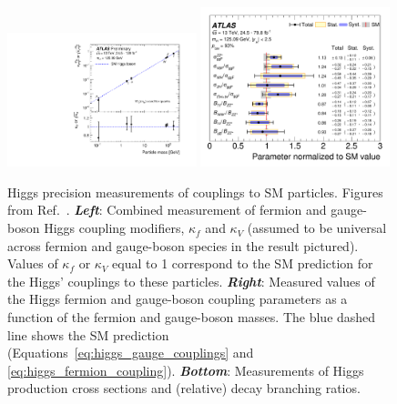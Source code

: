 \begin{figure}[!htb]
    \begin{center}
        \includegraphics[width=0.49\textwidth]{figures/chapter1/sm_final/higgs_kappa_vs_mass}
        \includegraphics[width=0.49\textwidth]{figures/chapter1/sm_final/higgs_prod_and_br}
        \caption{
            Higgs precision measurements of couplings to SM particles.
            Figures from Ref.~\cite{HiggsProps}.
            \textit{\textbf{Left}}: Combined measurement of fermion and gauge-boson Higgs coupling modifiers, $\kappa_f$
                and $\kappa_V$ (assumed to be universal across fermion and gauge-boson species in the result pictured).
                Values of $\kappa_f$ or $\kappa_V$ equal to 1 correspond to the SM prediction for the Higgs' couplings to
                these particles.
            \textit{\textbf{Right}}: Measured values of the Higgs fermion and gauge-boson coupling parameters
                as a function of the fermion and gauge-boson masses.
                The blue dashed line shows the SM prediction (Equations~\ref{eq:higgs_gauge_couplings} and \ref{eq:higgs_fermion_coupling}).
            \textit{\textbf{Bottom}}: Measurements of Higgs production cross sections and (relative) decay branching ratios.
        }
        \label{fig:higgs_measurements}
    \end{center}
\end{figure}

